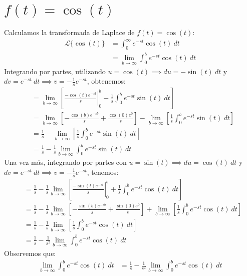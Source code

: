 \documentclass[12pt, a4paper]{article}
\begin{document}
\setcounter{section}{7}
\section{\texorpdfstring{\(f(t)=\cos(t)\)}{f (t) = cos (t)}}

Calculamos la transformada de Laplace de \(f(t) = \cos(t)\):
\begin{align*}
	\mathcal{L}\{\cos (t)\} &= \int_{0}^{\infty} e^{-st} \cos(t)\ dt \\
	&= \lim_{b \to \infty} \int_{0}^{b} e^{-st} \cos(t)\ dt
\end{align*}
Integrando por partes, utilizando \(u = \cos(t) \implies du = -\sin(t)\ dt\) y \(dv = e^{-st}\ dt \implies v = -\frac{1}{s} e^{-st}\), obtenemos:
\begin{align*}
	&= \lim_{b \to \infty} \left[ \left. \frac{-\cos (t) e^{-st}}{s} \right|_{0}^{b} - \frac{1}{s} \int_{0}^{b} e^{-st} \sin (t) \ dt \right] \\
	&= \lim_{b \to \infty} \left[ - \frac{\cos (b) e^{-sb}}{s} + \frac{\cos (0) e^{0}}{s} \right] - \lim_{b \to \infty} \left[ \frac{1}{s} \int_{0}^{b} e^{-st} \sin (t) \ dt \right] \\
	&= \frac{1}{s} - \lim_{b \to \infty} \left[ \frac{1}{s} \int_{0}^{b} e^{-st} \sin (t) \ dt \right] \\
	&= \frac{1}{s} - \frac{1}{s} \lim_{b \to \infty} \int_{0}^{b} e^{-st} \sin (t) \ dt
\end{align*}
Una vez más, integrando por partes con \(u = \sin (t) \implies du = \cos (t)\ dt\) y \(dv = e^{-st}\ dt \implies v = -\frac{1}{s} e^{-st}\), tenemos:
\begin{align*}
	&= \frac{1}{s} - \frac{1}{s} \lim_{b \to \infty} \left[ \left. \frac{-\sin (t) e^{-st}}{s} \right|_{0}^{b} + \frac{1}{s} \int_{0}^{b} e^{-st} \cos (t)\ dt \right] \\
	&= \frac{1}{s} - \frac{1}{s} \lim_{b \to \infty} \left[ - \frac{\sin (b) e^{-sb}}{s} + \frac{\sin (0) e^{0}}{s} \right] + \lim_{b \to \infty} \left[ \frac{1}{s} \int_{0}^{b} e^{-st} \cos (t)\ dt \right] \\
	&= \frac{1}{s} - \frac{1}{s} \lim_{b \to \infty} \left[ \frac{1}{s} \int_{0}^{b} e^{-st} \cos (t)\ dt \right] \\
	&= \frac{1}{s} - \frac{1}{s^{2}} \lim_{b \to \infty} \int_{0}^{b} e^{-st} \cos (t) \ dt
\end{align*}
Observemos que:
\begin{align*}
	\lim_{b \to \infty} \int_{0}^{b} e^{-st} \cos (t) \ dt &= \frac{1}{s} - \frac{1}{s^{2}}\lim_{b \to \infty} \int_{0}^{b} e^{-st} \cos (t) \ dt
\end{align*}
\end{document}
